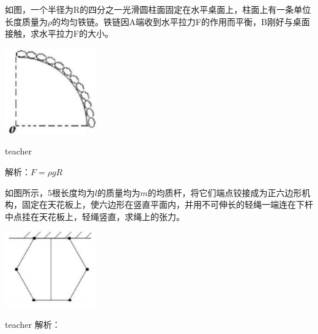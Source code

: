 \begin{example}
	如图，一个半径为R的四分之一光滑圆柱面固定在水平桌面上，柱面上有一条单位长度质量为$\rho$的均匀铁链。铁链因A端收到水平拉力F的作用而平衡，B刚好与桌面接触，求水平拉力F的大小。
\begin{flushright}
\includegraphics[width = 0.3\textwidth]{images/smallAna-4.pdf} 
\end{flushright}

\begin{taggedblock}{teacher}

解析：$F=\rho gR$
\end{taggedblock}
\end{example}


\begin{example}
	如图所示，5根长度均为$l$的质量均为$m$的均质杆，将它们端点铰接成为正六边形机构，固定在天花板上，使六边形在竖直平面内，并用不可伸长的轻绳一端连在下杆中点挂在天花板上，轻绳竖直，求绳上的张力。
\begin{flushright}
\includegraphics[width = 0.3\textwidth]{images/smallAna-5.pdf} 
\end{flushright}
\begin{taggedblock}{teacher}
解析：
\end{taggedblock}
\end{example}


